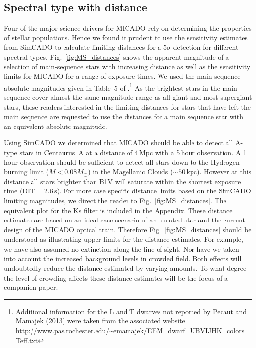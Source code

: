 \subsection{Spectral type with distance}
\label{subsec:spec_type_vs_dist}

Four of the major science drivers for MICADO rely on determining the properties of stellar populations. Hence we found it prudent to use the sensitivity estimates from SimCADO to calculate limiting distances for a $5\sigma$ detection for different spectral types. Fig.~\ref{fig:MS_distances} shows the apparent magnitude of a selection of main-sequence stars with increasing distance as well as the sensitivity limits for MICADO for a range of exposure times. 
We used the main sequence absolute magnitudes given in Table~5 of \citet{pecaut2013}.\footnote{Additional information for the L and T dwarves not reported by Pecaut and Mamajek (2013) were taken from the associated website \url{http://www.pas.rochester.edu/~emamajek/EEM_dwarf_UBVIJHK_colors_Teff.txt}} As the brightest stars in the main sequence cover almost the same magnitude range as all giant and most supergiant stars, those readers interested in the limiting distances for stars that have left the main sequence are requested to use the distances for a main sequence star with an equivalent absolute magnitude. 

Using SimCADO we determined that MICADO should be able to detect all A-type stars in Centaurus~A at a distance of 4\,Mpc with a 5\,hour observation. A 1\,hour observation should be sufficient to detect all stars down to the Hydrogen burning limit ($M < 0.08 M_{\odot}$) in the Magellanic Clouds ($\sim 50\,\mathrm{kpc}$). However at this distance all stars brighter than B1V will saturate within the shortest exposure time ($\mathrm{DIT} =2.6\,\mathrm{s}$). For more case specific distance limits based on the SimCADO limiting magnitudes, we direct the reader to Fig.~\ref{fig:MS_distances}. The equivalent plot for the Ks filter is included in the Appendix. These distance estimates are based on an ideal case scenario of an isolated star and the current design of the MICADO optical train. Therefore Fig.~\ref{fig:MS_distances} should be understood as illustrating upper limits for the distance estimates. For example, we have also assumed no extinction along the line of sight. Nor have we taken into account the increased background levels in crowded field. Both effects will undoubtedly reduce the distance estimated by varying amounts. To what degree the level of crowding affects these distance estimates will be the focus of a companion paper.


